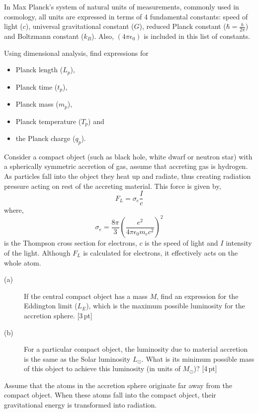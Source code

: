In Max Planck's system of natural units of measurements, commonly used in
cosmology, all units are expressed in terms of 4 fundamental constants: speed
of light ($c$), universal gravitational constant ($G$), reduced Planck
constant ($\hbar = \frac{h}{2\pi}$) and Boltzmann constant ($k_B$). Also,
$(4\pi\epsilon_0)$ is included in this list of constants.

Using dimensional analysis, find expressions for
\begin{itemize}
\item Planck length ($L_p$),
\item Planck time ($t_p$),
\item Planck mass ($m_p$),
\item Planck temperature ($T_p$) and
\item the Planck charge ($q_p$).
\end{itemize}

Consider a compact object (such as black hole, white dwarf or neutron star)
with a spherically symmetric accretion of gas, assume that accreting gas is
hydrogen. As particles fall into the object they heat up and radiate, thus
creating radiation pressure acting on rest of the accreting material. This
force is given by,
\[ F_L = \sigma_e \frac{I}{c} \]
where,
\[ \sigma_e = \frac{8\pi}{3}
   \left(\frac{e^2}{4\pi\epsilon_0 m_e c^2}\right)^2 \]
is the Thompson cross section for electrons, $c$ is the speed of light and $I$
intensity of the light. Although $F_L$ is calculated for electrons, it
effectively acts on the whole atom.

\begin{description}
\item[(a)] If the central compact object has a mass $M$, find an expression
  for the Eddington limit ($L_E$), which is the maximum possible luminosity
  for the accretion sphere. \hfill[3\,pt]
\item[(b)] For a particular compact object, the luminosity due to material
  accretion is the same as the Solar luminosity $L_\odot$. What is its minimum
  possible mass of this object to achieve this luminosity (in units of
  $M_\odot$)? \hfill[4\,pt]
\end{description}

Assume that the atoms in the accretion sphere originate far away from the
compact object. When these atoms fall into the compact object, their
gravitational energy is transformed into radiation.

